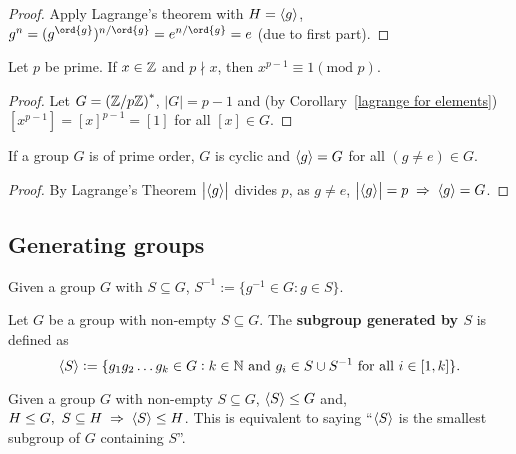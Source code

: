 \documentclass[../Year1/Year1.tex]{subfiles}
\begin{document}
\begin{proof}
    Apply Lagrange's theorem with $H=\left\langle g \right\rangle$, $g^n = {(g^{\ord{g}})^{n/\ord{g}}}=e^{n/\ord{g}}=e$ (due to first part).
\end{proof}

\begin{corollary}
    Let $p$ be prime. If $x\in\mathbb{Z}$ and $p\nmid x$, then $x^{p-1}\equiv 1 (\text{mod }p)$.
\end{corollary}

\begin{proof}
    Let $G={(\mathbb{Z}/p\mathbb{Z})}^*$, $|G|=p-1$ and (by Corollary~\ref{lagrange for elements}) $[x^{p-1}]={[x]}^{p-1}=[1]$ for all $[x]\in G$.
\end{proof}

\begin{corollary}
    If a group $G$ is of prime order, $G$ is cyclic and $\left\langle g \right\rangle=G$ for all $(g\neq e)\in G$.
\end{corollary}

\begin{proof}
    By Lagrange's Theorem $\left|\left\langle g \right\rangle\right|$ divides $p$, as $g\neq e$, $\aabr{g}=p\implies \abr{g}=G$.
\end{proof}

\subsection{Generating groups}

\begin{definition}
    Given a group $G$ with $S\subseteq G$, $S^{-1}:=\{g^{-1}\in G:g\in S\}$.
\end{definition}

\begin{definition}
    Let $G$ be a group with non-empty $S\subseteq G$. The \textbf{subgroup generated by $S$} is defined as \[
        \abr{S} := \{g_1g_2\ldots g_k\in G: k\in\NN \ \text{\textcolor{black}{and }} g_i\in S\cup S^{-1} \ \text{\textcolor{black}{for all }} i\in[1,k]\}
        \textcolor{black}{.}
    \]
\end{definition}

\vspace{-30pt}

\begin{lemma}
    Given a group $G$ with non-empty $S\subseteq G$, $\left\langle S \right\rangle\leq G$ and, $H\leq G, \ S\subseteq H \implies \abr{S} \leq H$. This is equivalent to saying ``$\left\langle S \right\rangle$ is the smallest subgroup of $G$ containing $S$''.
\end{lemma}
\end{document}

